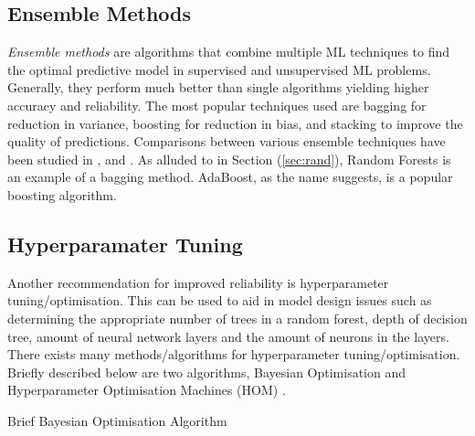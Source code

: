 \subsection{Ensemble Methods}
\textit{Ensemble methods} are algorithms that combine multiple ML techniques to find the optimal predictive model in supervised and unsupervised ML problems.
Generally, they perform much better than single algorithms yielding higher accuracy and reliability.
The most popular techniques used are bagging for reduction in variance, boosting for reduction in bias, and stacking to improve the quality of predictions.
Comparisons between various ensemble techniques have been studied in \cite{7340924}, \cite{8389056} and \cite{1358033}.
As alluded to in Section (\ref{sec:rand}), Random Forests is an example of a bagging method. AdaBoost, as the name suggests, is a popular boosting algorithm.

\subsection{Hyperparamater Tuning}
Another recommendation for improved reliability is hyperparameter tuning/optimisation.
This can be used to aid in model design issues such as determining the appropriate number of trees in a random forest,
depth of decision tree, amount of neural network layers and the amount of neurons in the layers.
There exists many methods/algorithms for hyperparameter tuning/optimisation. 
Briefly described below are two algorithms, Bayesian Optimisation \cite{7900023} and Hyperparameter Optimisation Machines (HOM) \cite{7796889}.

\begin{algorithm}[H]
    \SetAlgoLined
    \caption{Brief Bayesian Optimisation Algorithm \cite{7900023}}
\end{algorithm}

